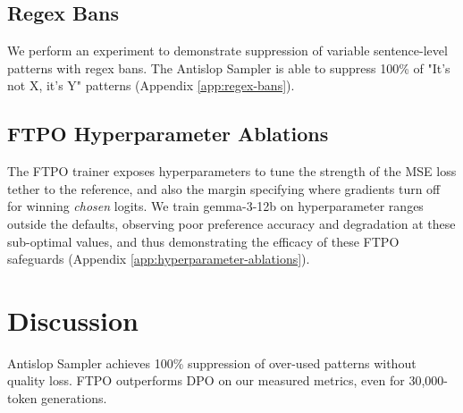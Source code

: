 \documentclass[11pt]{article}
\begin{document}


\subsection{Regex Bans}

We perform an experiment to demonstrate suppression of variable sentence-level patterns with regex bans. The Antislop Sampler is able to suppress 100\% of "It's not X, it's Y" patterns (Appendix \ref{app:regex-bans}).

\subsection{FTPO Hyperparameter Ablations}

The FTPO trainer exposes hyperparameters to tune the strength of the MSE loss tether to the reference, and also the margin specifying where gradients turn off for winning \textit{chosen} logits. We train gemma-3-12b on hyperparameter ranges outside the defaults, observing poor preference accuracy and degradation at these sub-optimal values, and thus demonstrating the efficacy of these FTPO safeguards (Appendix \ref{app:hyperparameter-ablations}).

\section{Discussion}

Antislop Sampler achieves 100\% suppression of over-used patterns without quality loss. FTPO outperforms DPO on our measured metrics, even for 30,000-token generations.
\end{document}
